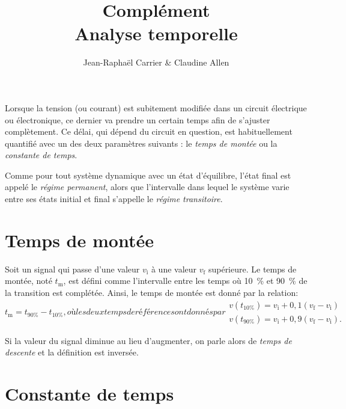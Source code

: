 \documentclass[12pt,oneside,letterpaper]{article}
\begin{document}
\title{\textbf{Complément}\\Analyse temporelle}
\author{Jean-Raphaël Carrier \& Claudine Allen}
\date{}
\maketitle


Lorsque la tension (ou courant) est subitement modifiée dans un circuit électrique ou électronique, ce dernier va prendre un certain temps afin de s'ajuster complètement. Ce délai, qui dépend du circuit en question, est habituellement quantifié avec un des deux paramètres suivants : le \textit{temps de montée} ou la \textit{constante de temps}.

Comme pour tout système dynamique avec un état d'équilibre, l'état final est appelé le \textit{régime permanent}, alors que l'intervalle dans lequel le système varie entre ses états initial et final s'appelle le \textit{régime transitoire}.


\section{Temps de montée}

Soit un signal qui passe d'une valeur $v_{\mathrm{i}}$ à une valeur $v_{\mathrm{f}}$ supérieure. Le temps de montée, noté $t_{\mathrm{m}}$, est défini comme l'intervalle entre les temps où 10~\% et 90~\% de la transition est complétée. Ainsi, le temps de montée est donné par la relation:
\begin{subequations}
\begin{equation}
t_{\mathrm{m}}=t_{90\%}-t_{10\%},
\end{equation}
où les deux temps de référence sont donnés par
\begin{gather}
v\!\left(t_{10\%}\right)=v_{\mathrm{i}}+0,\!1\left(v_{\mathrm{f}}-v_{\mathrm{i}}\right)\\
v\!\left(t_{90\%}\right)=v_{\mathrm{i}}+0,\!9\left(v_{\mathrm{f}}-v_{\mathrm{i}}\right).
\end{gather}
\end{subequations}

Si la valeur du signal diminue au lieu d'augmenter, on parle alors de \textit{temps de descente} et la définition est inversée.


\section{Constante de temps}
\end{document}
